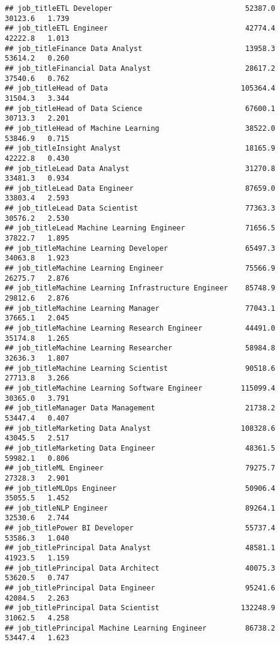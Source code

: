 \documentclass[
]{article}
\begin{document}
\begin{verbatim}
## job_titleETL Developer                               52387.0    30123.6   1.739
## job_titleETL Engineer                                42774.4    42222.8   1.013
## job_titleFinance Data Analyst                        13958.3    53614.2   0.260
## job_titleFinancial Data Analyst                      28617.2    37540.6   0.762
## job_titleHead of Data                               105364.4    31504.3   3.344
## job_titleHead of Data Science                        67600.1    30713.3   2.201
## job_titleHead of Machine Learning                    38522.0    53846.9   0.715
## job_titleInsight Analyst                             18165.9    42222.8   0.430
## job_titleLead Data Analyst                           31270.8    33481.3   0.934
## job_titleLead Data Engineer                          87659.0    33803.4   2.593
## job_titleLead Data Scientist                         77363.3    30576.2   2.530
## job_titleLead Machine Learning Engineer              71656.5    37822.7   1.895
## job_titleMachine Learning Developer                  65497.3    34063.8   1.923
## job_titleMachine Learning Engineer                   75566.9    26275.7   2.876
## job_titleMachine Learning Infrastructure Engineer    85748.9    29812.6   2.876
## job_titleMachine Learning Manager                    77043.1    37665.1   2.045
## job_titleMachine Learning Research Engineer          44491.0    35174.8   1.265
## job_titleMachine Learning Researcher                 58984.8    32636.3   1.807
## job_titleMachine Learning Scientist                  90518.6    27713.8   3.266
## job_titleMachine Learning Software Engineer         115099.4    30365.0   3.791
## job_titleManager Data Management                     21738.2    53447.4   0.407
## job_titleMarketing Data Analyst                     108328.6    43045.5   2.517
## job_titleMarketing Data Engineer                     48361.5    59982.1   0.806
## job_titleML Engineer                                 79275.7    27328.3   2.901
## job_titleMLOps Engineer                              50906.4    35055.5   1.452
## job_titleNLP Engineer                                89264.1    32530.6   2.744
## job_titlePower BI Developer                          55737.4    53586.3   1.040
## job_titlePrincipal Data Analyst                      48581.1    41923.5   1.159
## job_titlePrincipal Data Architect                    40075.3    53620.5   0.747
## job_titlePrincipal Data Engineer                     95241.6    42084.5   2.263
## job_titlePrincipal Data Scientist                   132248.9    31062.5   4.258
## job_titlePrincipal Machine Learning Engineer         86738.2    53447.4   1.623

\end{verbatim}
\end{document}
